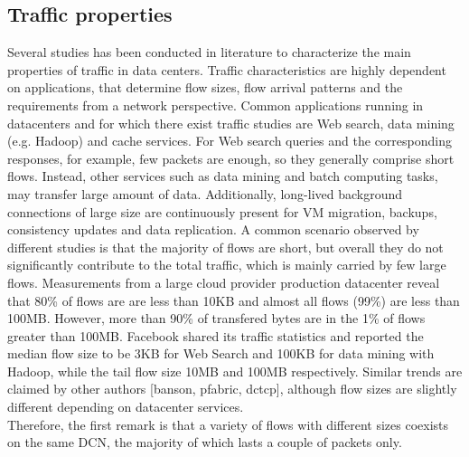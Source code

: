 \subsection{Traffic properties}
\label{sec:traffic-properties}
Several studies has been conducted in literature to characterize the main properties of traffic in data centers. Traffic characteristics are highly dependent on applications, that determine flow sizes, flow arrival patterns and the requirements from a network perspective. Common applications running in datacenters and for which there exist traffic studies are Web search, data mining (e.g. Hadoop) and cache services. For Web search queries and the corresponding responses, for example, few packets are enough, so they generally comprise short flows. Instead, other services such as data mining and batch computing tasks, may transfer large amount of data. Additionally, long-lived background connections of large size are continuously present for VM migration, backups, consistency updates and data replication. A common scenario observed by different studies is that the majority of flows are short, but overall they do not significantly contribute to the total traffic, which is mainly carried by few large flows. Measurements from a large cloud provider production datacenter reveal that 80\% of flows are are less than 10KB and almost all flows (99\%) are less than 100MB. However, more than 90\% of transfered bytes are in the 1\% of flows greater than 100MB.  Facebook \cite{facebook_dcn} shared its traffic statistics and reported the median flow size to be 3KB for Web Search and 100KB for data mining with Hadoop, while the tail flow size 10MB and 100MB respectively. Similar trends are claimed by other authors [banson, pfabric, dctcp], although flow sizes are slightly different depending on datacenter services. \\ 
Therefore, the first remark is that a variety of flows with different sizes coexists on the same DCN, the majority of which lasts a couple of packets only. 

